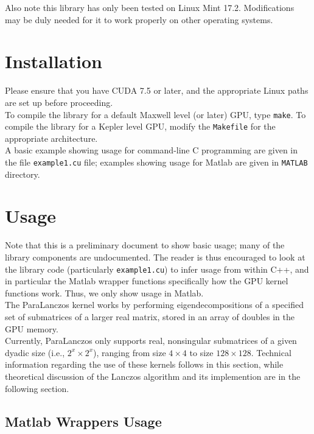 \documentclass{amsart}
\begin{document}
 Also note this library has only been tested on Linux Mint 17.2.  Modifications may be duly needed for it to work properly on other operating systems.

\section{Installation}

Please ensure that you have CUDA 7.5 or later, and the appropriate Linux paths are set up before proceeding.\\

To compile the library for a default Maxwell level (or later) GPU, type {\tt make}.  To compile the library for a Kepler level GPU, modify the {\tt Makefile} for the appropriate architecture.  \\

A basic example showing usage for command-line C programming are given in the file {\tt example1.cu} file;  examples showing usage for Matlab are given in {\tt MATLAB} directory.

\section{Usage}

Note that this is a preliminary document to show basic usage;  many of the library components are undocumented.  The reader is thus encouraged to look at the library code (particularly {\tt example1.cu}) to infer usage from within C++, and in particular the Matlab wrapper functions specifically how the GPU kernel functions work. Thus, we only show usage in Matlab.\\

The ParaLanczos kernel works by performing eigendecompositions of a specified set of submatrices of a larger real matrix, stored in an array of doubles in the GPU memory.\\

Currently, ParaLanczos only supports real, nonsingular submatrices of a given dyadic size (i.e., $2^x \times 2^x$), ranging from size $4 \times 4$ to size $128 \times 128$.  Technical information regarding the use of these kernels follows in this section, while theoretical discussion of the Lanczos algorithm and its implemention are in the following section. 


\subsection{Matlab Wrappers Usage}
\end{document}
